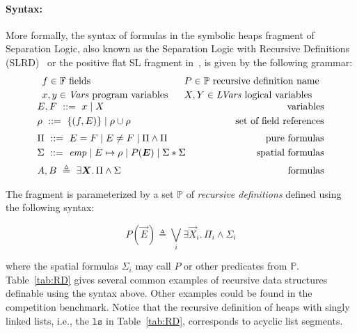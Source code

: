 \documentclass{llncs}
\newcommand{\sep}{.\,}
\newcommand{\posep}{*}
\newcommand{\points}{\mapsto}
\newcommand{\vars}{\mathit{Vars}}
\newcommand{\lvars}{\mathit{LVars}}
\newcommand{\pfields}{\mathbb{F}}
\newcommand{\preds}{\mathbb{P}}
\newcommand{\ls}{\mathtt{ls}}
\begin{document}
\paragraph{Syntax:}
More formally, the syntax of formulas in the symbolic heaps fragment of Separation Logic,
also known as the Separation Logic with Recursive Definitions (SLRD)~\cite{IosifRS13} or
the positive flat SL fragment in~\cite{AntonopoulosGHKO14}, 
is given by the following grammar:
$$
\begin{array}{c}
\begin{array}{ll}
f \in \pfields \mbox{ fields} ~&~
P \in \preds \mbox{ recursive definition name}
\\[0.8mm]
x,y \in \vars \mbox{ program variables} ~&~
X,Y \in \lvars \mbox{ logical variables}
\end{array}
\\[2mm]
%
%
E,F\ ::=\ x \mid X 
\hfill \mbox{variables}
\\[1mm]
\rho\ ::=\ \{ (f,E) \} \mid \rho\cup\rho 
\hfill \mbox{set of field references}
\\[2mm]
%
\Pi\ ::=\ E = F \mid E \neq F \mid \Pi \land \Pi \hfill 
\mbox{pure formulas}\\[1mm]
%
\Sigma\ ::=\
\mathit{emp} \mid
E \points \rho \mid 
P(\vec{E}) \mid 
\Sigma \posep \Sigma 
%
\hspace{1cm}\hfill \mbox{spatial formulas}
\\[2mm]
A,B\ \triangleq\ \exists \vec{X}\sep \Pi\land\Sigma \hfill \mbox{formulas} %
\end{array}
$$

The fragment is parameterized by a set $\preds$ of
\emph{recursive definitions} defined using the following syntax:

\begin{equation}\label{eq:RD}
P(\vec{E}) \triangleq \bigvee_i \exists \vec{X}_i\sep \Pi_i \land \Sigma_i
\end{equation}

where the spatial formulas $\Sigma_i$ may call $P$ or other predicates from $\preds$.
Table~\ref{tab:RD} gives several common examples of recursive data structures definable using the syntax above. Other examples could be found in the competition benchmark.
%
Notice that the recursive definition of heaps with singly linked lists, i.e., the $\ls$ in Table~\ref{tab:RD},
corresponds to acyclic list segments.
\end{document}
